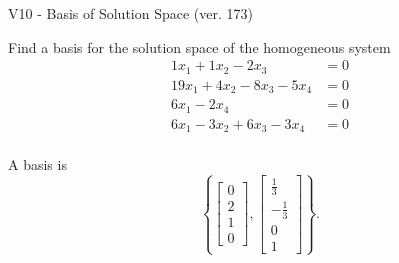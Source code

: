 \begin{exercise}
  \begin{exerciseTitle}V10 - Basis of Solution Space (ver. 173)\end{exerciseTitle}
  \begin{exerciseStatement}
    Find a basis for the solution space of the homogeneous system 
\begin{align*}
 1 x_ 1 + 1 x_ 2 -2 x_ 3 &= 0  \\ 
  19 x_ 1 + 4 x_ 2 -8 x_ 3 -5 x_ 4 &= 0  \\ 
  6 x_ 1 -2 x_ 4 &= 0  \\ 
  6 x_ 1 -3 x_ 2 + 6 x_ 3 -3 x_ 4 &= 0  \\ 
 \end{align*}


 
  \end{exerciseStatement}

  \begin{exerciseAnswer}
   A basis is   
\[\left\{\left[\begin{array}{c}
0 \\
2 \\
1 \\
0
\end{array}\right] , \left[\begin{array}{c}
\frac{1}{3} \\
-\frac{1}{3} \\
0 \\
1
\end{array}\right]\right\}.\]

  


  \end{exerciseAnswer}
\end{exercise}